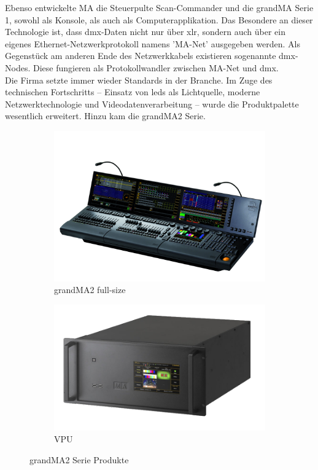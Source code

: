 \documentclass[11pt]{scrartcl}
\begin{document}
\noindent
Ebenso entwickelte MA die Steuerpulte Scan-Commander und die grandMA Serie 1, sowohl als
Konsole, als auch als Computerapplikation. Das Besondere an dieser Technologie ist, dass \ac{dmx}-Daten
nicht nur über \ac{xlr}, sondern auch über ein eigenes Ethernet-Netzwerkprotokoll namens 'MA-Net'
ausgegeben werden. Als Gegenstück am anderen Ende des Netzwerkkabels existieren sogenannte
\ac{dmx}-Nodes. Diese fungieren als Protokollwandler zwischen MA-Net und \ac{dmx}.\\
Die Firma setzte immer wieder Standards in der Branche. Im Zuge des technischen Fortschritts –
Einsatz von \ac{led}s als Lichtquelle, moderne Netzwerktechnologie und Videodatenverarbeitung –
wurde die Produktpalette wesentlich erweitert. Hinzu kam die grandMA2 Serie.\\
\begin{figure}[H]
    \centering
    \begin{subfigure}[b]{0.45\textwidth}
        \includegraphics[width=\textwidth]{images/MA_grandMA2_full-size.png}
        \caption{grandMA2 full-size}
    \end{subfigure}
    \hfill 
    \begin{subfigure}[b]{0.4\textwidth}
        \includegraphics[width=\textwidth]{images/MA-VPU-plus_d.png}
        \caption{VPU \cite{gma2products}}
    \end{subfigure}
    \caption{grandMA2 Serie Produkte}\label{fig:gma2}
\end{figure}
\end{document}
